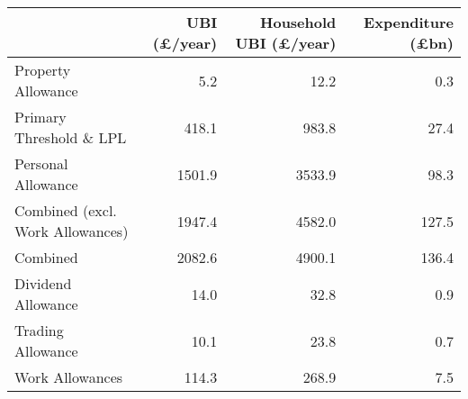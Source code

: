 \begin{tabular}{lrrr}
\toprule
{} &  UBI (£/year) &  Household UBI (£/year) &  Expenditure (£bn) \\
\midrule
Property Allowance               &           5.2 &                    12.2 &                0.3 \\
Primary Threshold \& LPL          &         418.1 &                   983.8 &               27.4 \\
Personal Allowance               &        1501.9 &                  3533.9 &               98.3 \\
Combined (excl. Work Allowances) &        1947.4 &                  4582.0 &              127.5 \\
Combined                         &        2082.6 &                  4900.1 &              136.4 \\
Dividend Allowance               &          14.0 &                    32.8 &                0.9 \\
Trading Allowance                &          10.1 &                    23.8 &                0.7 \\
Work Allowances                  &         114.3 &                   268.9 &                7.5 \\
\bottomrule
\end{tabular}
